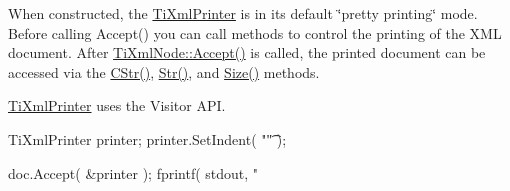 When constructed, the \hyperlink{class_ti_xml_printer}{TiXmlPrinter} is in its default \char`\"{}pretty printing\char`\"{} mode. Before calling Accept() you can call methods to control the printing of the XML document. After \hyperlink{class_ti_xml_node_acc0f88b7462c6cb73809d410a4f5bb86}{TiXmlNode::Accept()} is called, the printed document can be accessed via the \hyperlink{class_ti_xml_printer_a859eede9597d3e0355b77757be48735e}{CStr()}, \hyperlink{class_ti_xml_printer_a3bd4daf44309b41f5813a833caa0d1c9}{Str()}, and \hyperlink{class_ti_xml_printer_ad01375ae9199bd2f48252eaddce3039d}{Size()} methods.

\hyperlink{class_ti_xml_printer}{TiXmlPrinter} uses the Visitor API. \begin{DoxyVerb}
	TiXmlPrinter printer;
	printer.SetIndent( "\t" );

	doc.Accept( &printer );
	fprintf( stdout, "%
	\end{DoxyVerb}
 

